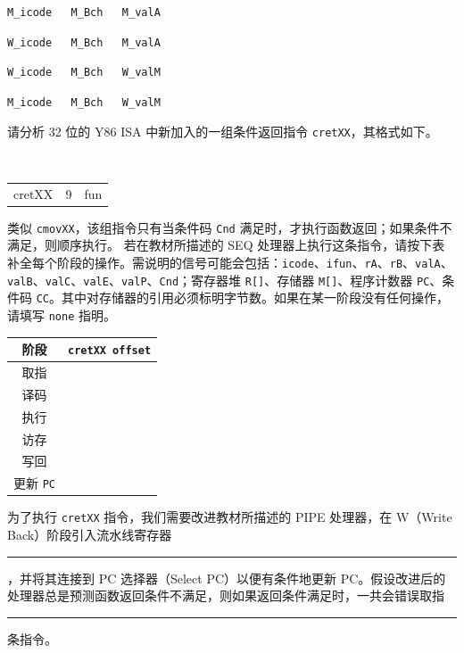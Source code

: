 \begin{problems}
        \begin{choices}
            \item \verb|M_icode   M_Bch   M_valA|
            \item \verb|W_icode   M_Bch   M_valA|
            \item \verb|W_icode   M_Bch   W_valM|
            \item \verb|M_icode   M_Bch   W_valM|
        \end{choices}
         请分析 32 位的 Y86 ISA 中新加入的一组条件返回指令 \verb|cretXX|，其格式如下。
        \begin{table}[H]
            \tt
            \centering
            \begin{tabular}{c|c|c|}
                \cline{2-3}
                cretXX & 9 & fun \\ \cline{2-3} 
            \end{tabular}
        \end{table}
        类似 \verb|cmovXX|，该组指令只有当条件码 \verb|Cnd| 满足时，才执行函数返回；如果条件不满足，则顺序执行。
        \qn 若在教材所描述的 SEQ 处理器上执行这条指令，请按下表补全每个阶段的操作。需说明的信号可能会包括：\verb|icode|、\verb|ifun|、\verb|rA|、\verb|rB|、\verb|valA|、\verb|valB|、\verb|valC|、\verb|valE|、\verb|valP|、\verb|Cnd|；寄存器堆 \verb|R[]|、存储器 \verb|M[]|、程序计数器 \verb|PC|、条件码 \verb|CC|。其中对存储器的引用必须标明字节数。如果在某一阶段没有任何操作，请填写 \texttt{none} 指明。
        \begin{table}[H]
            \centering
            \begin{tabular}{|c|c|}
                \hline
                阶段 & {\qquad \qquad \qquad \qquad} \verb|cretXX offset| {\qquad \qquad \qquad \qquad} \\ \hline
                取指 & \rule{0pt}{8ex} \\ \hline
                译码 & \rule{0pt}{8ex} \\ \hline
                执行 & \rule{0pt}{8ex} \\ \hline
                访存 & \rule{0pt}{8ex} \\ \hline
                写回 & \rule{0pt}{8ex} \\ \hline
                更新 \verb|PC| & \rule{0pt}{8ex} \\ \hline
            \end{tabular}
        \end{table}
        \qn 为了执行 \verb|cretXX| 指令，我们需要改进教材所描述的 PIPE 处理器，在 W（Write Back）阶段引入流水线寄存器 \rule{2.5cm}{0.25mm}，并将其连接到 PC 选择器（Select PC）以便有条件地更新 PC。假设改进后的处理器总是预测函数返回条件不满足，则如果返回条件满足时，一共会错误取指 \rule{2.5cm}{0.25mm} 条指令。

\end{problems}
